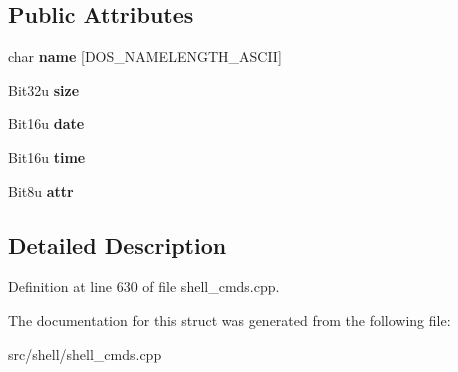 \subsection*{Public Attributes}
\begin{DoxyCompactItemize}
\item 
\hypertarget{structDtaResult_a35acc0819ed5d484ae67b0a150702e65}{char {\bfseries name} \mbox{[}D\-O\-S\-\_\-\-N\-A\-M\-E\-L\-E\-N\-G\-T\-H\-\_\-\-A\-S\-C\-I\-I\mbox{]}}\label{structDtaResult_a35acc0819ed5d484ae67b0a150702e65}

\item 
\hypertarget{structDtaResult_ae204e54f6811d77f19876e6b7856ca58}{Bit32u {\bfseries size}}\label{structDtaResult_ae204e54f6811d77f19876e6b7856ca58}

\item 
\hypertarget{structDtaResult_ab6706554a1f9124eaf932dfff90dc962}{Bit16u {\bfseries date}}\label{structDtaResult_ab6706554a1f9124eaf932dfff90dc962}

\item 
\hypertarget{structDtaResult_a654e696728853f730e909750a2b35932}{Bit16u {\bfseries time}}\label{structDtaResult_a654e696728853f730e909750a2b35932}

\item 
\hypertarget{structDtaResult_a01eb3c4fe466f291e8ffd3d788ee9d6c}{Bit8u {\bfseries attr}}\label{structDtaResult_a01eb3c4fe466f291e8ffd3d788ee9d6c}

\end{DoxyCompactItemize}


\subsection{Detailed Description}


Definition at line 630 of file shell\-\_\-cmds.\-cpp.



The documentation for this struct was generated from the following file\-:\begin{DoxyCompactItemize}
\item 
src/shell/shell\-\_\-cmds.\-cpp\end{DoxyCompactItemize}
